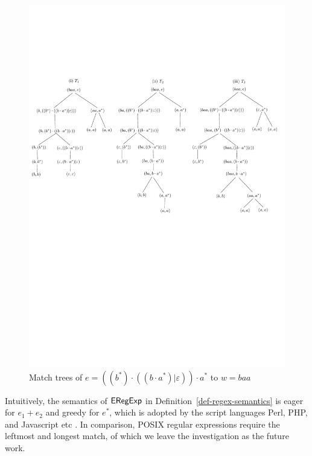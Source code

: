 \begin{example}
\begin{figure}[ht]
\includegraphics[scale=0.7]{regex-semantics.pdf}
\caption{Match trees of $e=((b^\ast) \cdot ((b \cdot a^\ast) | \varepsilon)) \cdot a^\ast$ to $w= baa$}
\label{fig-regex-semantics}
\end{figure}
 \end{example}
  
\begin{remark}
Intuitively, the semantics of ${\sf ERegExp}$ in Definition~\ref{def-regex-semantics} is eager for $e_1 + e_2$ and greedy for $e^\ast$, which is adopted by the script languages Perl, PHP, and Javascript etc \cite{MasterREbook}. In comparison, POSIX regular expressions require the leftmost and longest match, of which we leave the investigation as the future work. 
\end{remark}
  

